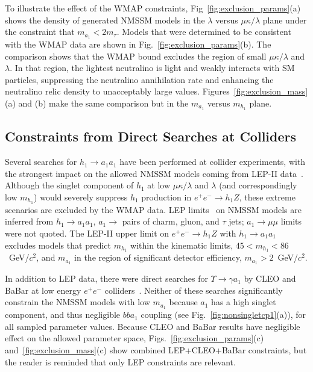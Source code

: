 \documentclass[aps,prl,twocolumn,nofootinbib,superscriptaddress]{revtex4}
\begin{document}
To illustrate the effect of the WMAP constraints,
Fig~\ref{fig:exclusion_params}(a) shows the density of generated NMSSM
models in the $\lambda$ versus $\mu\kappa/\lambda$ plane under the
constraint that $m_{a_1} < 2m_\tau$.  Models that were determined to
be consistent with the WMAP data are shown in
Fig.~\ref{fig:exclusion_params}(b).  The comparison shows that the
WMAP bound excludes the region of small $\mu\kappa/\lambda$ and
$\lambda$.  In that region, the lightest neutralino is light and
weakly interacts with SM particles, suppressing the neutralino
annihilation rate and enhancing the neutralino relic density to
unacceptably large values.  Figures~\ref{fig:exclusion_mass}(a) and
(b) make the same comparison but in the $m_{a_1}$ versus $m_{h_1}$
plane.

\subsection{Constraints from Direct Searches at Colliders}

Several searches for $h_1 \to a_1 a_1$ have been performed at collider
experiments, with the strongest impact on the allowed NMSSM models
coming from LEP-II data~\cite{lep2exclusion}.  Although the singlet
component of $h_1$ at low $\mu\kappa/\lambda$ and $\lambda$ (and
correspondingly low $m_{h_1}$) would severely suppress $h_1$
production in $e^+e^- \to h_1 Z$, these extreme scenarios are excluded
by the WMAP data.  LEP limits~\cite{lep2exclusion} on NMSSM models are
inferred from $h_1 \to a_1 a_1$, $a_1 \to$ pairs of charm, gluon, and
$\tau$ jets; $a_1 \to \mu\mu$ limits were not quoted.  The LEP-II
upper limit on $e^+ e^- \to h_1 Z$ with $h_1 \to a_1 a_1$ excludes
models that predict $m_{h_1}$ within the kinematic limits, $45 <
m_{h_1} < 86$~GeV/$c^2$, and $m_{a_1}$ in the region of significant
detector efficiency, $m_{a_1} > 2$~GeV/$c^2$.

In addition to LEP data, there were direct searches for $\Upsilon \to
\gamma a_1$ by CLEO and BaBar at low energy $e^+e^-$
colliders~\cite{cleo-low-ma,babar-low-ma}.  Neither of these searches
significantly constrain the NMSSM models with low $m_{a_1}$ because
$a_1$ has a high singlet component, and thus negligible $bba_1$
coupling (see Fig.~\ref{fig:nonsingletcp1}(a)), for all sampled
parameter values.  Because CLEO and BaBar results have negligible
effect on the allowed parameter space,
Figs.~\ref{fig:exclusion_params}(c) and~\ref{fig:exclusion_mass}(c)
show combined LEP+CLEO+BaBar constraints, but the reader is reminded
that only LEP constraints are relevant.
\end{document}
